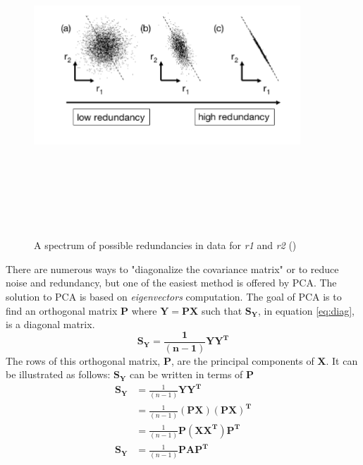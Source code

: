 \begin{figure}[H]
	\centering
	\includegraphics[width=10cm,height=12cm,keepaspectratio]{files/redundancy.png}
	\caption{A spectrum of possible redundancies in data for \textit{r1} and \textit{r2} (\cite{shlens2014tutorial})}
	\label{fig:redundancy}
\end{figure}
There are numerous ways to "diagonalize the covariance matrix" or to reduce noise and redundancy, but one of the easiest method is offered by PCA. The solution to PCA is based on \textit{eigenvectors} computation. 
The goal of PCA is to find an orthogonal matrix $\mathbf{P}$ where $\mathbf{Y = PX}$ such that $\mathbf{S_Y}$, in equation \ref{eq:diag}, is a diagonal matrix. \\
\begin{equation}\label{eq:diag}
\mathbf{S_Y = \frac{1}{(n-1)}YY^T}
\end{equation}
The rows of this orthogonal matrix, $\mathbf{P}$, are the principal components of $\mathbf{X}$. It can be illustrated as follows: $\mathbf{S_Y}$ can be written in terms of $\mathbf{P}$\\
\begin{equation} \label{eq:split}
\begin{split}
\mathbf{S_Y} & = \frac{1}{(n-1)}\mathbf{YY^T}\\
& = \frac{1}{(n-1)}\mathbf{(PX)(PX)^T}\\
& = \frac{1}{(n-1)}\mathbf{P(XX^T)P^T}\\
\mathbf{S_Y} &= \frac{1}{(n-1)}\mathbf{PAP^T}\\
\end{split}
\end{equation}
